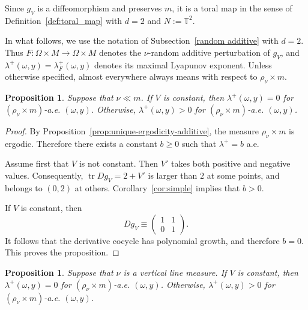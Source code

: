 \documentclass[a4paper,12pt,reqno]{amsart}
\numberwithin{equation}{section}
\newtheorem{proposition}[theorem]{Proposition}
\newcommand{\Tt}{{\mathbb{T}}}
\begin{document}
Since $g_V$ is a diffeomorphism and preserves $m$, it is a toral map in the sense of Definition~\ref{def:toral_map} with $d=2$ and $N:=\Tt^2$.

In what follows, we use the notation of Subsection~\ref{random additive} with $d=2$. Thus $F \colon \Omega \times M \to \Omega \times M$ denotes the $\nu$-random additive perturbation of $g_V$, and $\lambda^{+}(\omega,y)=\lambda^{+}_F(\omega,y)$ denotes its maximal Lyapunov exponent. Unless otherwise specified, almost everywhere always means with respect to $\rho_\nu \times m$. 

\begin{proposition}
\label{prop:standard-absolute}
Suppose that $\nu \ll m$. If $V$ is constant, then $\lambda^+(\omega,y) = 0$ for $(\rho_\nu \times m)$-a.e. $(\omega,y)$. Otherwise, $\lambda^+(\omega,y) > 0$ for $(\rho_\nu \times m)$-a.e. $(\omega,y)$.
\end{proposition}

\begin{proof}
By Proposition~\ref{prop:unique-ergodicity-additive}, the measure $\rho_\nu \times m$ is ergodic. Therefore there exists a constant $b \ge 0$ such that $\lambda^+ = b$ a.e.

Assume first that $V$ is not constant. Then $V'$ takes both positive and negative values. Consequently, $\operatorname{tr}Dg_V=2+V'$ is larger than $2$ at some points, and belongs to $(0,2)$ at others. Corollary~\ref{cor:simple} implies that $b>0$. 

If $V$ is constant, then
\[
Dg_V \equiv
\begin{pmatrix}
1 & 1 \\
0 & 1
\end{pmatrix}.
\]
It follows that the derivative cocycle has polynomial growth, and therefore $b=0$. This proves the proposition.
\end{proof}


\begin{proposition}
\label{prop:standard-singular}
Suppose that $\nu$ is a vertical line measure. If $V$ is constant, then $\lambda^+(\omega,y) = 0$ for $(\rho_\nu \times m)$-a.e. $(\omega,y)$. Otherwise, $\lambda^+(\omega,y) > 0$ for $(\rho_\nu \times m)$-a.e. $(\omega,y)$.
\end{proposition}
\end{document}
